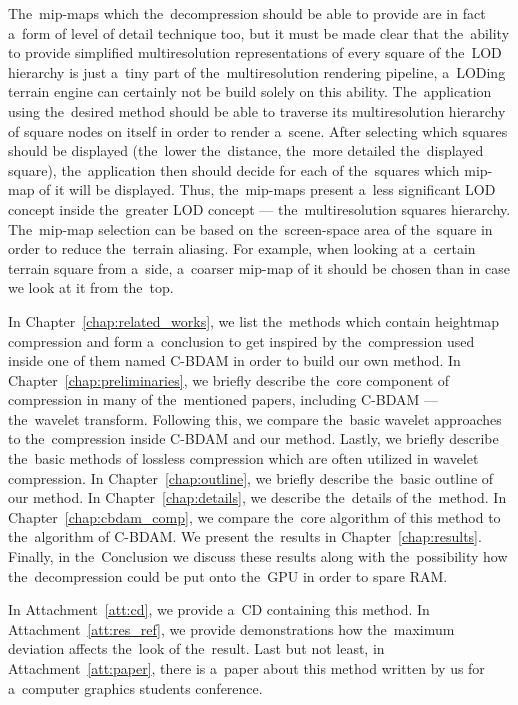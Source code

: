 The~mip-maps which the~decompression should be able to provide are in fact a~form of level of detail technique too, but it must be made clear that the~ability to provide simplified multiresolution representations of every square of the~LOD hierarchy is just a~tiny part of the~multiresolution rendering pipeline, a~LODing terrain engine can certainly not be build solely on this ability. The~application using the~desired method should be able to traverse its multiresolution hierarchy of square nodes on itself in order to render a~scene. After selecting which squares should be displayed (the~lower the~distance, the~more detailed the~displayed square), the~application then should decide for each of the~squares which mip-map of it will be displayed. Thus, the~mip-maps present a~less significant LOD concept inside the~greater LOD concept --- the~multiresolution squares hierarchy. The~mip-map selection can be based on the~screen-space area of the~square in order to reduce the~terrain aliasing. For example, when looking at a~certain terrain square from a~side, a~coarser mip-map of it should be chosen than in case we look at it from the~top.

In Chapter~\ref{chap:related_works}, we list the~methods which contain heightmap compression and form a~conclusion to get inspired by the~compression used inside one of them named C-BDAM in order to build our own method. In Chapter~\ref{chap:preliminaries}, we briefly describe the~core component of compression in many of the~mentioned papers, including C-BDAM --- the~wavelet transform. Following this, we compare the~basic wavelet approaches to the~compression inside C-BDAM and our method. Lastly, we briefly describe the~basic methods of lossless compression which are often utilized in wavelet compression. In Chapter~\ref{chap:outline}, we briefly describe the~basic outline of our method. In Chapter~\ref{chap:details}, we describe the~details of the~method. In Chapter~\ref{chap:cbdam_comp}, we compare the~core algorithm of this method to the~algorithm of C-BDAM. We present the~results in Chapter~\ref{chap:results}. Finally, in the~Conclusion we discuss these results along with the~possibility how the~decompression could be put onto the~GPU in order to spare RAM.

In Attachment~\ref{att:cd}, we provide a~CD containing this method. In Attachment~\ref{att:res_ref}, we provide demonstrations how the~maximum deviation affects the~look of the~result. Last but not least, in Attachment~\ref{att:paper}, there is a~paper about this method written by us for a~computer graphics students conference.